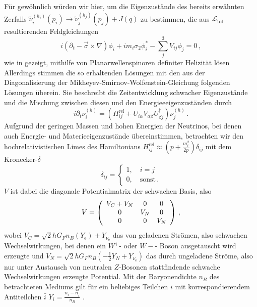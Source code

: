 Für gewöhnlich würden wir hier, um die Eigenzustände des bereits erwähnten Zerfalls $\tilde{\nu}^{(h_i)}_i (p_i) \rightarrow \tilde{\nu}^{(h_j)}_j (p_j) + J(q)$ zu bestimmen, 
die aus $\mathcal{L}_\text{tot}$ resultierenden Feldgleichungen 
\begin{equation}
    i \left(\partial_t - \vec{\sigma} \times \nabla \right) \phi_i + i m_i \sigma_2 \phi^*_i - \sum^3_j V_{i j} \phi_j = 0 \,,
\end{equation}
wie in \cite{komponentendinger} gezeigt, mithilfe von Planarwellenspinoren definiter Helizität lösen 
Allerdings stimmen die so erhaltenden Lösungen mit den aus der Diagonalisierung der Mikheyev-Smirnov-Wolfenstein-Gleichung folgenden Lösungen überein.
Sie beschreibt die Zeitentwicklung schwacher Eigenzustände und die Mischung zwischen diesen und den Energieeeigenzuständen durch
\begin{equation}
    i \partial_t \nu^{(h)}_i = \left(H^\text{rel}_{i j} + U_{i \alpha} V_{\alpha \beta} U^\dagger_{\beta j}\right) \nu^{(h)}_j \,.
    \label{eq:MSW-gleichung}
\end{equation}
Aufgrund der geringen Massen und hohen Energien der Neutrinos, bei denen auch Energie- und Materieeigenzustände übereinstimmen, betrachten wir den hochrelativistischen Limes des Hamiltonians $H^\text{rel}_{i j} \approx \left(p + \frac{m^2_i}{2 p}\right) \delta_{ij}$ mit dem Kronecker-$\delta$
\begin{equation}
    \delta_{ij} = \begin{cases}
                    1, \quad i=j \\
                    0, \quad \text{sonst} \,.
                  \end{cases}
                  \label{eq:kronecker}
\end{equation}
$V$ ist dabei die diagonale Potentialmatrix der schwachen Basis, also
\begin{equation}
    V = \left( \begin{array}{c c c}
        V_C + V_N   &   0     &     0   \\ 
        0           &   V_N   &     0   \\ 
        0           &   0     &     V_N  \\
        \end{array}\right) \,,
\end{equation}
wobei $V_C = \sqrt{2} h G_F n_B (Y_\text{e}) + Y_{\nu_\text{e}}$ das von geladenen Strömen, also schwachen Wechselwirkungen, bei denen ein $W^+$- oder $W-$- Boson ausgetauscht wird erzeugte und 
$V_N = \sqrt{2} h G_F n_B \left(-\frac{1}{2} Y_N + Y_{\nu_\text{e}}\right)$ das durch ungeladene Ströme, also nur unter Austausch von neutralen $Z$-Bosonen stattfindende schwache Wechselwirkungen erzeugte Potential.
Mit der Baryonendichte $n_B$ des betrachteten Mediums gilt für ein beliebiges Teilchen $i$ mit korrespondierendem Antiteilchen $\bar{i}$ $Y_i = \frac{n_i - n_{\bar{i}}}{n_B}$ \cite{päspaper}.

